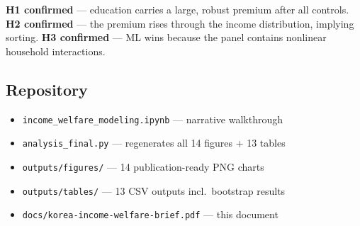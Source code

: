 \documentclass[11pt,a4paper]{article}
\begin{document}
\textbf{H1 confirmed} — education carries a large, robust premium after all controls.
\textbf{H2 confirmed} — the premium rises through the income distribution, implying sorting.
\textbf{H3 confirmed} — ML wins because the panel contains nonlinear household interactions.

\subsection*{Repository}
\begin{itemize}[leftmargin=1.5em, itemsep=1pt]
  \item \texttt{income\_welfare\_modeling.ipynb} — narrative walkthrough
  \item \texttt{analysis\_final.py} — regenerates all 14 figures + 13 tables
  \item \texttt{outputs/figures/} — 14 publication-ready PNG charts
  \item \texttt{outputs/tables/} — 13 CSV outputs incl.\ bootstrap results
  \item \texttt{docs/korea-income-welfare-brief.pdf} — this document
\end{itemize}
\end{document}
